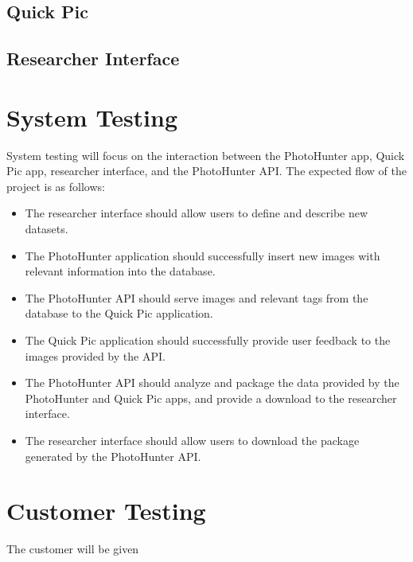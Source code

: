 \documentclass{article}
\begin{document}
\subsection{Quick Pic}
\subsection{Researcher Interface}
 

\section{System Testing}
System testing will focus on the interaction between the PhotoHunter app, Quick Pic app, researcher interface, and the PhotoHunter API. 
The expected flow of the project is as follows:
\begin{itemize}
\item The researcher interface should allow users to define and describe new datasets.
\item The PhotoHunter application should successfully insert new images with relevant information into the database.
\item The PhotoHunter API should serve images and relevant tags from the database to the Quick Pic application.
\item The Quick Pic application should successfully provide user feedback to the images provided by the API. 
\item The PhotoHunter API should analyze and package the data provided by the PhotoHunter and Quick Pic apps, and provide a download to the researcher interface.
\item The researcher interface should allow users to download the package generated by the PhotoHunter API.
\end{itemize}

\section{Customer Testing}
The customer will be given
\end{document}

